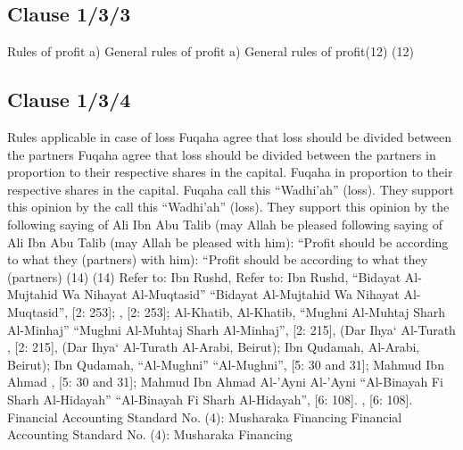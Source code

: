 \documentclass{article}%
\begin{document}
%
\subsection{Clause 1/3/3}%
\label{subsec:Clause1/3/3}%
Rules of profit a) General rules of profit a) General rules of profit(12) (12)

%
\subsection{Clause 1/3/4}%
\label{subsec:Clause1/3/4}%
Rules applicable in case of loss   Fuqaha agree that loss should be divided between the partners    Fuqaha agree that loss should be divided between the partners  in proportion to their respective shares in the capital. Fuqaha  in proportion to their respective shares in the capital. Fuqaha  call this “Wadhi’ah” (loss). They support this opinion by the  call this “Wadhi’ah” (loss). They support this opinion by the  following saying of Ali Ibn Abu Talib (may Allah be pleased  following saying of Ali Ibn Abu Talib (may Allah be pleased  with him): “Profit should be according to what they (partners)  with him): “Profit should be according to what they (partners)  (14) (14) Refer to: Ibn Rushd,   Refer to: Ibn Rushd, “Bidayat Al-Mujtahid Wa Nihayat Al-Muqtasid” “Bidayat Al-Mujtahid Wa Nihayat Al-Muqtasid”, [2: 253];  , [2: 253];  Al-Khatib,  Al-Khatib, “Mughni Al-Muhtaj Sharh Al-Minhaj” “Mughni Al-Muhtaj Sharh Al-Minhaj”, [2: 215], (Dar Ihya` Al-Turath  , [2: 215], (Dar Ihya` Al-Turath  Al-Arabi, Beirut); Ibn Qudamah,  Al-Arabi, Beirut); Ibn Qudamah, “Al-Mughni” “Al-Mughni”, [5: 30 and 31]; Mahmud Ibn Ahmad  , [5: 30 and 31]; Mahmud Ibn Ahmad  Al-’Ayni  Al-’Ayni “Al-Binayah Fi Sharh Al-Hidayah” “Al-Binayah Fi Sharh Al-Hidayah”, [6: 108].  , [6: 108].  Financial Accounting Standard No. (4): Musharaka Financing Financial Accounting Standard No. (4): Musharaka Financing

%
\end{document}
